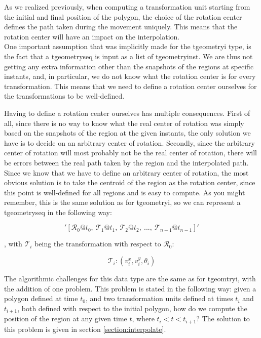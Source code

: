 As we realized previously, when computing a transformation unit starting from the initial and final position of the polygon, the choice of the rotation center defines the path taken during the movement uniquely. This means that the rotation center will have an impact on the interpolation. \\

One important assumption that was implicitly made for the tgeometryi type, is the fact that a tgeometryseq is input as a list of tgeometryinst. We are thus not getting any extra information other than the snapshots of the regions at specific instants, and, in particular, we do not know what the rotation center is for every transformation. This means that we need to define a rotation center ourselves for the transformations to be well-defined.

Having to define a rotation center ourselves has multiple consequences. First of all, since there is no way to know what the real center of rotation was simply based on the snapshots of the region at the given instants, the only solution we have is to decide on an arbitrary center of rotation. Secondly, since the arbitrary center of rotation will most probably not be the real center of rotation, there will be errors between the real path taken by the region and the interpolated path. \\

Since we know that we have to define an arbitrary center of rotation, the most obvious solution is to take the centroid of the region as the rotation center, since this point is well-defined for all regions and is easy to compute. As you might remember, this is the same solution as for tgeometryi, so we can represent a tgeometryseq in the following way:

\[
    '[\mathcal{R}_0@t_0,\ \mathcal{T}_1@t_1,\ \mathcal{T}_2@t_2,\ ..., \ \mathcal{T}_{n-1}@t_{n-1}]'
\]

, with $\mathcal{T}_i$ being the transformation with respect to $\mathcal{R}_0$:

\[
    \mathcal{T}_i: (v_i^x, v_i^y, \theta_i)
\]

The algorithmic challenges for this data type are the same as for tgeomtryi, with the addition of one problem. This problem is stated in the following way: given a polygon defined at time $t_0$, and two transformation units defined at times $t_i$ and $t_{i+1}$, both defined with respect to the initial polygon, how do we compute the position of the region at any given time $t$, where $t_i < t < t_{i+1}$? The solution to this problem is given in section \ref{section:interpolate}. \\


